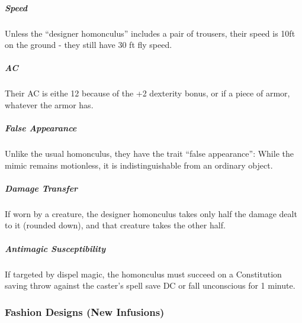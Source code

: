 \documentclass[twocolumn]{dndbook}
\begin{document}
\subparagraph{Speed}
Unless the ``designer homonculus'' includes a pair of trousers, their speed is 10ft on the ground - they still have 30 ft fly speed.

\subparagraph{AC}
Their AC is eithe 12 because of the +2 dexterity bonus, or if a piece of armor, whatever the armor has.

\subparagraph{False Appearance}
Unlike the usual homonculus, they have the trait ``false appearance'':
While the mimic remains motionless, it is indistinguishable from an ordinary object.

\subparagraph{Damage Transfer}
If worn by a creature, the designer homonculus takes only half the damage dealt to it (rounded down), and that creature takes the other half.

\subparagraph{Antimagic Susceptibility}
If targeted by dispel magic, the homonculus must succeed on a Constitution saving throw against the caster's spell save DC or fall unconscious for 1 minute.


\subsubsection{Fashion Designs (New Infusions)}
\end{document}
